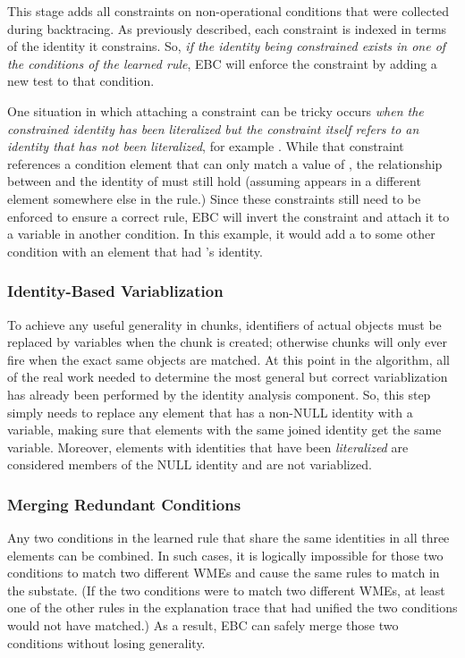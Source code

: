 This stage adds all constraints on non-operational conditions that were collected during backtracing.  As previously described, each constraint is indexed in terms of the identity it constrains.  So, \textit{if the identity being constrained exists in one of the conditions of the learned rule}, EBC will enforce the constraint by adding a new test to that condition.

One situation in which attaching a constraint can be tricky occurs \textit{when the constrained identity has been literalized but the constraint itself refers to an identity that has not been literalized}, for example .  While that constraint references a condition element that can only match a value of , the relationship between  and the identity of  must still hold (assuming  appears in a different element somewhere else in the rule.)  Since these constraints still need to be enforced to ensure a correct rule, EBC will invert the constraint and attach it to a variable in another condition.  In this example, it would add a  to some other condition with an element that had 's identity.

\subsubsection{Identity-Based Variablization}

To achieve any useful generality in chunks, identifiers of actual objects must be replaced by variables when the chunk is created; otherwise chunks will only ever fire when the exact same objects are matched.  At this point in the algorithm, all of the real work needed to determine the most general but correct variablization has already been performed by the identity analysis component.  So, this step simply needs to replace any element that has a non-NULL identity with a variable, making sure that elements with the same joined identity get the same variable.  Moreover, elements with identities that have been \textit{literalized} are considered members of the NULL identity and are not variablized.

\subsubsection{Merging Redundant Conditions}

Any two conditions in the learned rule that share the same identities in all three elements can be combined.  In such cases, it is logically impossible for those two conditions to match two different WMEs and cause the same rules to match in the substate.  (If the two conditions were to match two different WMEs, at least one of the other rules in the explanation trace that had unified the two conditions would not have matched.)  As a result, EBC can safely merge those two conditions without losing generality.  

